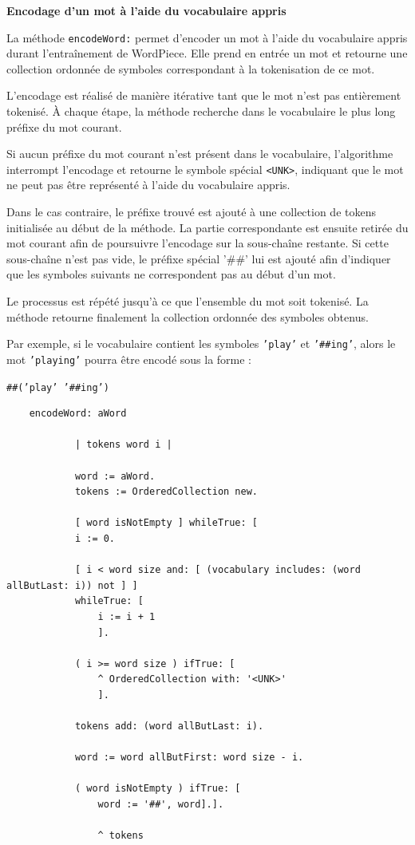 \documentclass[12pt,a4paper]{report}
\begin{document}
	\textbf{Encodage d’un mot à l’aide du vocabulaire appris}
	
	La méthode \texttt{encodeWord:} permet d’encoder un mot à l’aide du vocabulaire appris durant l’entraînement de WordPiece. Elle prend en entrée un mot et retourne une collection ordonnée de symboles correspondant à la tokenisation de ce mot.
	
	L’encodage est réalisé de manière itérative tant que le mot n’est pas entièrement tokenisé. À chaque étape, la méthode recherche dans le vocabulaire le plus long préfixe du mot courant.
	
	Si aucun préfixe du mot courant n’est présent dans le vocabulaire, l’algorithme interrompt l’encodage et retourne le symbole spécial \texttt{<UNK>}, indiquant que le mot ne peut pas être représenté à l’aide du vocabulaire appris.
	
	Dans le cas contraire, le préfixe trouvé est ajouté à une collection de tokens initialisée au début de la méthode. La partie correspondante est ensuite retirée du mot courant afin de poursuivre l’encodage sur la sous-chaîne restante. Si cette sous-chaîne n’est pas vide, le préfixe spécial '\#\#' lui est ajouté afin d’indiquer que les symboles suivants ne correspondent pas au début d’un mot.
	
	Le processus est répété jusqu’à ce que l’ensemble du mot soit tokenisé. La méthode retourne finalement la collection ordonnée des symboles obtenus.
	
	Par exemple, si le vocabulaire contient les symboles \texttt{'play'} et \texttt{'\#\#ing'}, alors le mot \texttt{'playing'} pourra être encodé sous la forme :
	
	\begin{center}
		\texttt{\#\#('play' '\#\#ing')}
	\end{center}
	
	\begin{verbatim}
	encodeWord: aWord
		
			| tokens word i |
				
			word := aWord.
			tokens := OrderedCollection new.
				
			[ word isNotEmpty ] whileTrue: [
			i := 0.
				
			[ i < word size and: [ (vocabulary includes: (word allButLast: i)) not ] ]
			whileTrue: [
				i := i + 1
				].
				
			( i >= word size ) ifTrue: [
				^ OrderedCollection with: '<UNK>'
				].
				
			tokens add: (word allButLast: i).
				
			word := word allButFirst: word size - i.
				
			( word isNotEmpty ) ifTrue: [
				word := '##', word].].
				
				^ tokens
	\end{verbatim}
	
\end{document}
